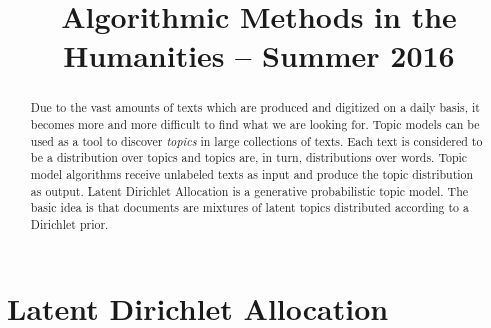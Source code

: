 \documentclass[a4paper,ngerman, english]{atseminar}
\title{Algorithmic Methods in the Humanities – Summer 2016}
\author{}
\begin{document}
\maketitle

\ENGLISH

\section{Latent Dirichlet Allocation}

\begin{abstract}
Due to the vast amounts of texts which are produced and digitized on a daily basis, it 
becomes more and more difficult to find what we are looking for. Topic models can 
be used as a tool to discover \textit{topics} in large collections of texts. Each text 
is considered to be a distribution over topics and topics are, in turn, distributions over
words. Topic model algorithms receive unlabeled texts as input and produce the topic 
distribution as output. 
Latent Dirichlet Allocation is a generative probabilistic topic model. The basic idea is
that documents are mixtures of latent topics distributed according to a Dirichlet prior.


\end{abstract}
\end{document}
